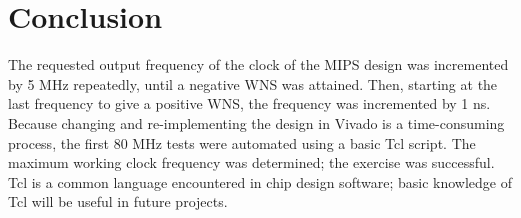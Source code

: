 \documentclass[CMPE]{KGCOEReport}
\begin{document}
\section*{Conclusion}

The requested output frequency of the clock of the MIPS design was incremented
by 5 MHz repeatedly, until a negative WNS was attained. Then, starting at the
last frequency to give a positive WNS, the frequency was incremented by 1 ns.
Because changing and re-implementing the design in Vivado is a time-consuming
process, the first 80 MHz tests were automated using a basic Tcl script. The
maximum working clock frequency was determined; the exercise was successful.
Tcl is a common language encountered in chip design software; basic knowledge
of Tcl will be useful in future projects.


\end{document}
